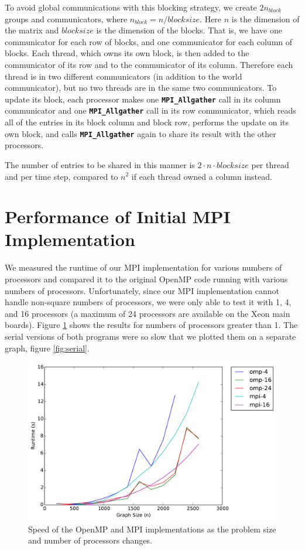 \documentclass[11pt]{article}
\begin{document}
To avoid global communications with this blocking strategy, we create $2n_{block}$ groups and communicators, where $n_{block}=n/blocksize$. 
Here $n$ is the dimension of the matrix and $blocksize$ is the dimension of the blocks. 
That is, we have one communicator for each row of blocks, and one communicator for each column of blocks. 
Each thread, which owns its own block, is then added to the communicator of its row and to the communicator of its column. 
Therefore each thread is in two different communicators (in addition to the world communicator), but no two threads are in the same two communicators.
To update its block, each processor makes one \textbf{\texttt{MPI\_Allgather}} call in its column communicator and one \textbf{ \texttt{MPI\_Allgather}} call in its row communicator, which reads all of the entries in its block column and block row, performs the update on its own block, and calls \textbf{\texttt{MPI\_Allgather}} again to share its result with the other processors.

The number of entries to be shared in this manner is $2 \cdot n \cdot blocksize$ per thread and per time step, compared to $n^2$ if each thread owned a column instead.

\section{Performance of Initial MPI Implementation}
We measured the runtime of our MPI implementation for various numbers of processors and compared it to the original OpenMP code running with various numbers of processors.
Unfortunately, since our MPI implementation cannot handle non-square numbers of processors, we were only able to test it with 1, 4, and 16 processors (a maximum of 24 processors are available on the Xeon main boards).
Figure \ref{fig:mpi-omp} shows the results for numbers of processors greater than 1.
The serial versions of both programs were so slow that we plotted them on a separate graph, figure \ref{fig:serial}.

\begin{figure}[h]
	\centering
	\includegraphics[width=.8\textwidth]{mpi_omp_comparison.pdf}
	\caption{Speed of the OpenMP and MPI implementations as the problem size and number of processors changes.}
	\label{fig:mpi-omp}
\end{figure}
\end{document}
